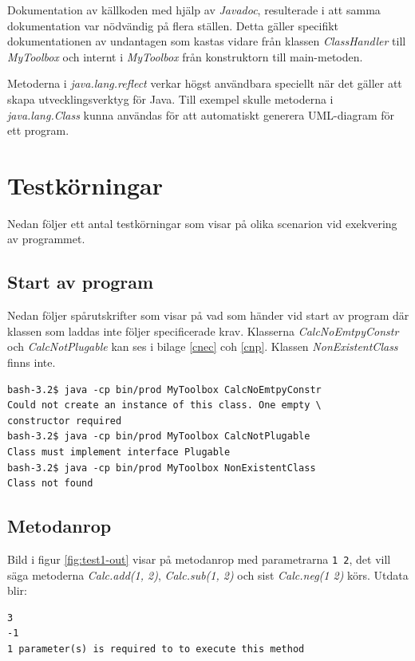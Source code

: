 \documentclass[a4paper, 12pt]{article}
\begin{document}
Dokumentation av källkoden med hjälp av \textit{Javadoc}, resulterade
i att samma dokumentation var nödvändig på flera ställen. Detta gäller
specifikt dokumentationen av undantagen som kastas vidare från klassen
\textit{ClassHandler} till \textit{MyToolbox} och internt i
\textit{MyToolbox} från konstruktorn till main-metoden.

Metoderna i \textit{java.lang.reflect} verkar högst användbara
speciellt när det gäller att skapa utvecklingsverktyg för Java. Till
exempel skulle metoderna i \textit{java.lang.Class} kunna användas för
att automatiskt generera UML-diagram för ett program.

\section{Testkörningar}
Nedan följer ett antal testkörningar som visar på olika scenarion vid
exekvering av programmet.

\subsection{Start av program}
Nedan följer spårutskrifter som visar på vad som händer vid start av
program där klassen som laddas inte följer specificerade
krav. Klasserna \textit{CalcNoEmtpyConstr} och
\textit{CalcNotPlugable} kan ses i bilage \ref{cnec} coh
\ref{cnp}. Klassen \textit{NonExistentClass} finns inte.

\begin{verbatim}
bash-3.2$ java -cp bin/prod MyToolbox CalcNoEmtpyConstr
Could not create an instance of this class. One empty \
constructor required
bash-3.2$ java -cp bin/prod MyToolbox CalcNotPlugable
Class must implement interface Plugable
bash-3.2$ java -cp bin/prod MyToolbox NonExistentClass
Class not found
\end{verbatim}

\subsection{Metodanrop}
Bild i figur \ref{fig:test1-out} visar på metodanrop med parametrarna
\verb!1 2!, det vill säga metoderna \textit{Calc.add(1, 2)},
\textit{Calc.sub(1, 2)} och sist \textit{Calc.neg(1 2)} körs. Utdata
blir:

\begin{verbatim}
3
-1
1 parameter(s) is required to to execute this method
\end{verbatim}
\end{document}
